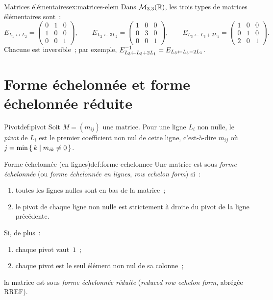 \begin{example}{Matrices élémentaires}{ex:matrices-elem}
  Dans $\mathcal{M}_{3,3}({\mathbb{R}})$, les trois types de matrices élémentaires sont~:
  \[
    E_{L_1\leftrightarrow L_2}=\begin{pmatrix}0&1&0\\1&0&0\\0&0&1\end{pmatrix},\qquad
    E_{L_2\leftarrow 3L_2}=\begin{pmatrix}1&0&0\\0&3&0\\0&0&1\end{pmatrix},\qquad
    E_{L_3\leftarrow L_3+2L_1}=\begin{pmatrix}1&0&0\\0&1&0\\2&0&1\end{pmatrix}.
  \]
  Chacune est inversible~; par exemple,
  ${E}^{-1}_{L_3\leftarrow L_3+2L_1}=E_{L_3\leftarrow L_3-2L_1}$.
\end{example}

\section{Forme échelonnée et forme échelonnée réduite}\label{sec:echelon}

\begin{definition}{Pivot}{def:pivot}
  Soit $M=(m_{ij})$ une matrice. Pour une ligne $L_i$ non nulle, le
  \emph{pivot} de $L_i$ est le premier coefficient non nul de
  cette ligne, c'est-à-dire $m_{ij}$ où $j=\min\left\{\,k\;\middle|\;m_{ik}\neq 0\,\right\}$.
\end{definition}

\begin{definition}{Forme échelonnée (en lignes)}{def:forme-echelonnee}
  Une matrice est sous \emph{forme échelonnée}
  (ou \emph{forme échelonnée en lignes}, \emph{row echelon form}) si~:
  \begin{enumerate}[label=(\roman*)]
    \item toutes les lignes nulles sont en bas de la matrice~;
    \item le pivot de chaque ligne non nulle est strictement à droite du
      pivot de la ligne précédente.
  \end{enumerate}
  Si, de plus~:
  \begin{enumerate}[label=(\roman*),resume]
    \item chaque pivot vaut~$1$~;
    \item chaque pivot est le seul élément non nul de sa colonne~;
  \end{enumerate}
  la matrice est sous \emph{forme échelonnée réduite}
  (\emph{reduced row echelon form}, abrégée RREF).
\end{definition}


